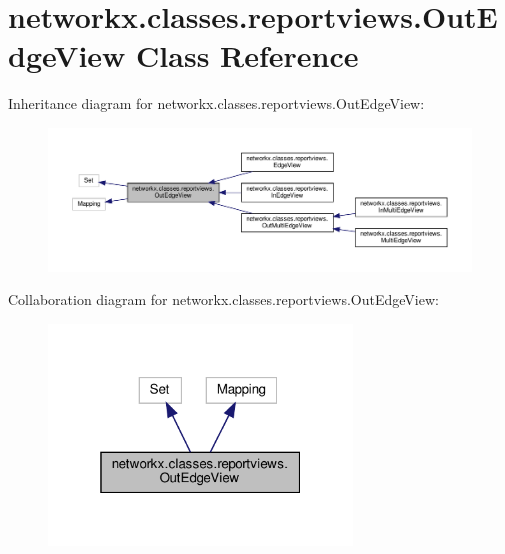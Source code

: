 \hypertarget{classnetworkx_1_1classes_1_1reportviews_1_1OutEdgeView}{}\section{networkx.\+classes.\+reportviews.\+Out\+Edge\+View Class Reference}
\label{classnetworkx_1_1classes_1_1reportviews_1_1OutEdgeView}


Inheritance diagram for networkx.\+classes.\+reportviews.\+Out\+Edge\+View\+:
\nopagebreak
\begin{figure}[H]
\begin{center}
\leavevmode
\includegraphics[width=350pt]{classnetworkx_1_1classes_1_1reportviews_1_1OutEdgeView__inherit__graph}
\end{center}
\end{figure}


Collaboration diagram for networkx.\+classes.\+reportviews.\+Out\+Edge\+View\+:
\nopagebreak
\begin{figure}[H]
\begin{center}
\leavevmode
\includegraphics[width=229pt]{classnetworkx_1_1classes_1_1reportviews_1_1OutEdgeView__coll__graph}
\end{center}
\end{figure}

